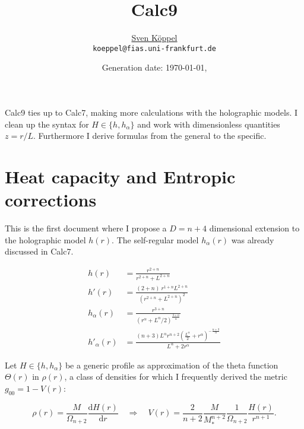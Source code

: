 \documentclass[10pt,a4paper, fleqn]{article}
\title{\vspace{-9ex} Calc9 \vspace{-1ex}} %
\author{\small %
\href{https://itp.uni-frankfurt.de/~koeppel}{Sven Köppel} \\
\small \texttt{koeppel@fias.uni-frankfurt.de}}
\date{\small Generation date: \today, \currenttime}
\begin{document}
\maketitle

\renewcommand{\d}{\mathrm{d}}
\newcommand{\dd}[2]{\frac{\mathrm{d} #1}{\mathrm{d} #2}}
\newcommand{\pp}[2]{\frac{\partial #1}{\partial #2}}
\renewcommand{\L}{L_P}
\newcommand{\pr}{p_r}
\newcommand{\psenk}{p_\perp}
\newcommand{\ebenso}{\biggl( ~ \therefore ~ \biggr) }
\newcommand{\metrik}[1]{\d s^2 = \left( #1 \right) \d t^2 \left( #1 \right)^{-1} \d r^2 + r^2 \d \Omega_{D-2}^2 }
\newcommand{\winkel}{r^2 \d \Omega^2}
\newcommand{\dann}{$\rightarrow~$}

\begin{multicols}{2}
Calc9 ties up to Calc7, making more calculations with the holographic models. I clean up the syntax for $H\in \{h, h_\alpha\}$ and work with dimensionless quantities $z=r/L$. Furthermore I derive formulas from the general to the specific.

\columnbreak
\tableofcontents
\end{multicols}

\section{Heat capacity and Entropic corrections}
This is the first document where I propose a $D=n+4$ dimensional extension to the holographic model $h(r)$. The self-regular model $h_\alpha(r)$ was already discussed in Calc7.

\begin{align}
h(r) &= \frac{r^{2+n}}{r^{2+n} + L^{2+n}} \label{eq:holo} \\
h'(r) &= \frac{(2+n)~ r^{1+n} L^{2+n}}{(r^{2+n} + L^{2+n})^2} \\
h_\alpha(r) &= \frac{r^{3+n}}{(r^\alpha + L^\alpha/2)^{\frac{3+n}{\alpha}}} \label{eq:selfreg} \\
h'_\alpha(r) &= \frac{(n+3) L^{\alpha } r^{n+2}
   \left(\frac{L^{\alpha
   }}{2}+r^{\alpha
   }\right)^{-\frac{n+3}{\alpha
   }}}{L^{\alpha }+2 r^{\alpha
   }}
\end{align}

Let $H \in \{h, h_\alpha\}$ be a generic profile as approximation of the theta function $\Theta(r)$ in $\rho(r)$, a class of densities for which I frequently derived the metric $g_{00}=1-V(r)$:

\begin{equation}
\rho(r) = \frac M {\Omega_{n+2}} \dd{H(r)}r \quad\Rightarrow\quad
V(r) = \frac{2}{n+2} \frac{M}{M_*^{n+2}} {\frac{1}{\Omega_{n+2}}} \frac{H(r)}{r^{n+1}}.  \label{eq:start}
\end{equation}
\end{document}
